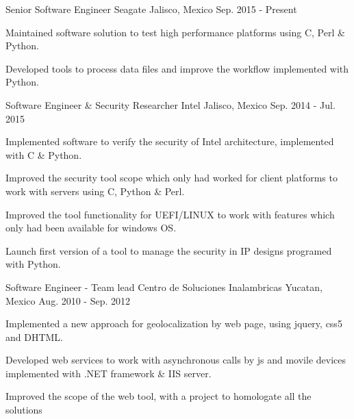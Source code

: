 


\begin{cventries}


\cventry
{Senior Software Engineer} %
{Seagate} %
{Jalisco, Mexico} %
{Sep. 2015 - Present } %
{ %
\begin{cvitems}
\item {Maintained software solution to test high performance platforms using C, Perl \& Python.}
\item {Developed tools to process data files and improve the workflow implemented 
with Python.}
\end{cvitems}
}


\cventry
{Software Engineer \& Security Researcher} %
{Intel} %
{Jalisco, Mexico} %
{Sep. 2014 -  Jul. 2015} %
{ %
\begin{cvitems}
\item {Implemented software to verify the security of Intel architecture, implemented with C \& Python.}
\item {Improved the security tool scope which only had worked for client platforms to work with servers using C, Python \& Perl.}
\item {Improved the tool functionality for UEFI/LINUX to work with features which only had been available for windows OS.}
\item {Launch first version of a tool to manage the security in IP designs programed with Python.}
\end{cvitems}
}


\cventry
{Software Engineer - Team lead } %
{Centro de Soluciones Inalambricas} %
{Yucatan, Mexico} %
{Aug. 2010 - Sep. 2012} %
{ %
\begin{cvitems}
\item {Implemented a new approach for geolocalization by web page, using jquery, css5 and DHTML.}
\item {Developed web services to work with asynchronous calls by js and movile devices implemented with .NET framework \& IIS server.}
\item {Improved the scope of the web tool, with a project to homologate all the solutions}
\end{cvitems} 
}


\end{cventries}
